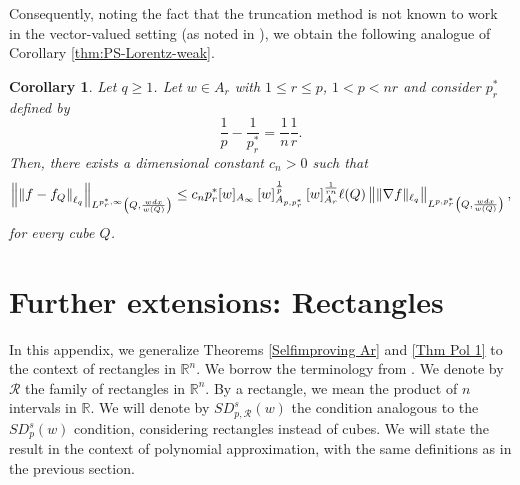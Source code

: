 \documentclass[reqno, 10pt, oneside]{amsart}
\numberwithin{equation}{section}
\newcommand{\strt}[1]{\rule{0pt}{#1}}
\newtheorem{corollary}[theorem]{Corollary}
\numberwithin{theorem}{section}
\newcommand{\R}{{\mathbb R}}
\newcommand{\norm}[1]{\left\|#1\right\|}
\newcommand{\1}{{\rm 1\hspace*{-0.4ex}%
\rule{0.1ex}{1.52ex}\hspace*{0.2ex}}}
\begin{document}
Consequently, noting the fact that the truncation method is not known to work in the vector-valued setting (as noted in \cite[p. 2]{MP}), we obtain the following analogue of Corollary \ref{thm:PS-Lorentz-weak}.
 
\begin{corollary}
	Let $q\ge 1$. Let $w\in A_r$ with $1\le r\le p$, $1< p< nr$ and consider $p_{r}^{*}$ defined by
\begin{equation*}
    \frac{1}{p}-\frac{1}{p_{r}^{*}}= \frac{1}{n} \frac{1}{r}. 
\end{equation*}
Then, there exists a dimensional constant $c_n>0$ such that
	\begin{equation*}
		\norm{\norm{f-f_Q}_{\ell_q}}_{\strt{2.3ex} L^{p^*_{r},\infty}\left(Q, \frac{w dx}{w(Q)}\right)}
		\le c_n p^*_{r} [w]_{A_\infty}\,[w]_{A_{p, p^*_{r}}}^{\frac{1}{p}}\,[w]_{A_r}^{\frac{1}{rn}}\ell(Q) \norm{ \|\nabla f\|_{\ell_q}}_{\strt{2.3ex} L^{p, p^*_{r}}\left(Q, \frac{w dx}{w(Q)}\right)},
	\end{equation*}
    for every cube $Q$.
\end{corollary}



\section{Further extensions: Rectangles}\label{S Rectangles}

In this appendix, we generalize Theorems \ref{Selfimproving Ar} and \ref{Thm Pol 1} to the context of rectangles in $\R^n$. We borrow the terminology from  \cite{CMPR}. We denote by $\mathcal{R}$ the family of rectangles in $\R^n$. By a rectangle, we mean the product of $n$ intervals in $\R$.  We will denote by $SD_{p,\mathcal{R}}^s(w)$ the condition analogous to the $SD_p^s(w)$ condition, considering rectangles instead of cubes. We will state the result in the context of polynomial approximation, with the same definitions as in the previous section. 
\end{document}
